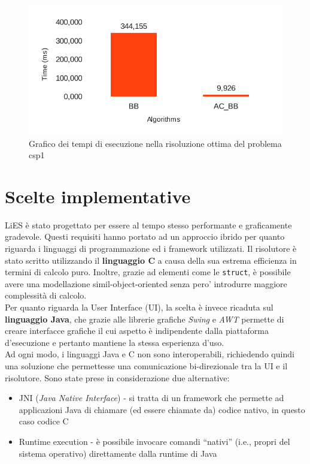\documentclass[10pt, a4paper]{article}
\begin{document}
\begin{figure}[!h]
\begin{center}
\includegraphics[scale=0.7]{./report-images/test3_time.pdf}
\caption{Grafico dei tempi di esecuzione nella risoluzione ottima del problema csp1}
\label{fig:test3_time}
\end{center}
\end{figure}

\section{Scelte implementative}
\label{sec:scelte_implementative}

LiES è stato progettato per essere al tempo stesso performante e graficamente gradevole. Questi requisiti hanno portato ad un approccio ibrido per quanto riguarda i linguaggi di programmazione ed i framework utilizzati. Il risolutore è stato scritto utilizzando il \textbf{linguaggio C} a causa della sua estrema efficienza in termini di calcolo puro. Inoltre, grazie ad elementi come le \verb+struct+, è possibile avere una modellazione simil-object-oriented senza pero' introdurre maggiore complessità di calcolo.\\

Per quanto riguarda la User Interface (UI), la scelta è invece ricaduta sul \textbf{linguaggio Java}, che grazie alle librerie grafiche \textit{Swing} e \textit{AWT} permette di creare interfacce grafiche il cui aspetto è indipendente dalla piattaforma d'esecuzione e pertanto mantiene la stessa esperienza d'uso.\\

Ad ogni modo, i linguaggi Java e C non sono interoperabili, richiedendo quindi una soluzione che permettesse una comunicazione bi-direzionale tra la UI e il risolutore. Sono state prese in considerazione due alternative:
\begin{itemize}
	\item JNI (\textit{Java Native Interface}) - si tratta di un framework che permette ad applicazioni Java di chiamare (ed essere chiamate da) codice nativo, in questo caso codice C
	\item Runtime execution - è possibile invocare comandi ``nativi'' (i.e., propri del sistema operativo) direttamente dalla runtime di Java
\end{itemize}
\end{document}
